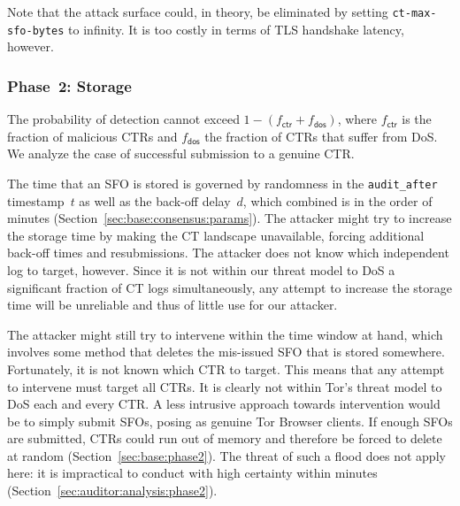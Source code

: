 Note that the attack surface could, in theory, be eliminated by setting
\texttt{ct-max-sfo-bytes} to infinity.  It is too costly in terms of TLS
handshake latency, however.

\subsubsection{Phase~2: Storage} \label{sec:analysis:pr:phase2}
The probability of detection cannot exceed $1-(f_{\mathsf{ctr}} +
f_{\mathsf{dos}})$, where $f_{\mathsf{ctr}}$ is the fraction of
malicious CTRs and $f_{\mathsf{dos}}$ the fraction of CTRs that suffer from
DoS.  We analyze the case of successful submission to a genuine CTR.

The time that an SFO is stored is governed by randomness in the
\texttt{audit\_after} timestamp~$t$ as well as the back-off delay~$d$,
which combined is in the order of minutes
	(Section~\ref{sec:base:consensus:params}).
The attacker might try to increase the storage time by making the CT landscape
unavailable, forcing additional back-off times and resubmissions.  The attacker
does not know which independent log to target, however.  Since it is not within
our threat model to DoS a significant fraction of CT logs simultaneously, any
attempt to increase the storage time will be unreliable and thus of little use
for our attacker.

The attacker might still try to intervene within the time window at hand, which
involves some method that deletes the mis-issued SFO that is stored somewhere.
Fortunately, it is not known which CTR to target.
This means that any attempt to intervene must target all CTRs.  It is clearly
not within Tor's threat model to DoS each and every CTR.  A less intrusive
approach towards intervention would be to simply submit SFOs, posing as genuine
Tor Browser clients.  If enough SFOs are submitted, CTRs could run out of memory
and therefore be forced to delete at random (Section~\ref{sec:base:phase2}).
The threat of such a flood does not apply here:
	it is impractical to conduct with high certainty within minutes
	(Section~\ref{sec:auditor:analysis:phase2}).

